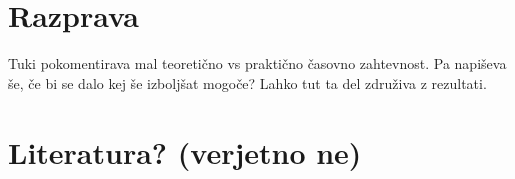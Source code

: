 \documentclass[a4paper,11pt]{article}
\begin{document}
\section{Razprava}
Tuki pokomentirava mal teoretično vs praktično časovno zahtevnost. Pa napiševa še, če bi se dalo kej še izboljšat mogoče? Lahko tut ta del združiva z rezultati.


\section{Literatura? (verjetno ne)}
\end{document}

